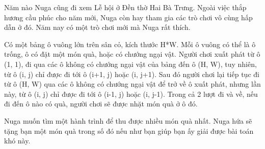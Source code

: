 Năm nào Nuga cũng đi xem Lễ hội ở Đền thờ Hai Bà Trưng. Ngoài việc thắp hương cầu phúc cho năm mới, Nuga còn hay tham gia các trò chơi vô cùng hấp dẫn ở đó. Năm nay có một trò chơi mới mà Nuga rất thích.  

   Có một bảng ô vuông lớn trên sân cỏ, kích thước H*W. Mỗi ô vuông có thể là ô trống, ô có đặt một món quà, hoặc có chướng ngại vật. Người chơi xuất phát từ ô (1, 1), đi qua các ô không có chướng ngại vật của bảng đến ô (H, W), tuy nhiên, từ ô (i, j) chỉ được đi tới ô (i+1, j) hoặc (i, j+1). Sau đó người chơi lại tiếp tục đi từ ô (H, W) qua các ô không có chướng ngại vật để trở về ô xuất phát, nhưng lần này, từ ô (i, j) chỉ được đi tới ô (i-1, j) hoặc (i, j-1). Trong cả 2 lượt đi và về, nếu đi đến ô nào có quà, người chơi sẽ được nhặt món quà ở ô đó.  

   Nuga muốn tìm một hành trình để thu được nhiều món quà nhất. Nuga hứa sẽ tặng bạn một món quà trong số đó nếu như bạn giúp bạn ấy giải được bài toán khó này.